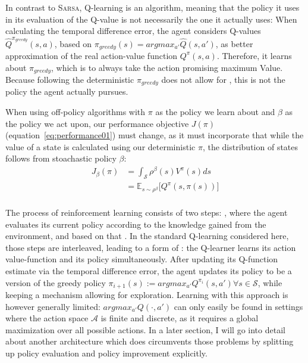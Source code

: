 In contrast to \textsc{Sarsa}, Q-learning is an  algorithm, meaning that the policy it uses in its evaluation of the Q-value is not necessarily the one it actually uses: When calculating the temporal difference error, the agent considers Q-values $\hat{Q}^{\pi_{greedy}}(s,a)$, based on $\pi_{greedy}(s) = argmax_{a'}\hat{Q}(s,a')$, as better approximation of the real action-value function $Q^\pi(s,a)$. Therefore, it learns about $\pi_{greedy}$, which is to always take the action promising maximum Value. Because following the deterministic $\pi_{greedy}$ does not allow for  , this is not the policy the agent actually pursues. 

When using off-policy algorithms with $\pi$ as the policy we learn about and $\beta$ as the policy we act upon, our performance objective $J(\pi)$ (equation~\ref{eq:performance01}) must change, as it must incorporate that while the value of a state is calculated using our deterministic $\pi$, the distribution of states follows from stoachastic policy $\beta$: 
\begin{align} 
	J_\beta(\pi) &= \int_{\mathcal{S}} \rho^\beta(s) V^\pi(s) ds \nonumber\\
	&= \mathds{E}_{s\sim\rho^\beta} \big[Q^\pi(s, \pi(s)) \big] \label{eq:performance}
\end{align}\\

The process of reinforcement learning consists of two steps: , where the agent evaluates its current policy according to the knowledge gained from the environment, and based on that . In the standard Q-learning considered here, those steps are interleaved, leading to a form of : the Q-learner learns its action value-function and its policy simultaneously. After updating its Q-function estimate via the temporal difference error, the agent updates its policy to be a  version of the greedy policy $\pi_{i+1}(s) := argmax_{a'} Q^{\pi_i}(s,a') \forall s \in \mathcal{S}$, while keeping a mechanism allowing for exploration.  Learning with this approach is however generally limited: $argmax_{a'}Q(\cdot, a')$ can only easily be found in settings where the action space $\mathcal{A}$ is finite and discrete, as it requires a global maximization over all possible actions. In a later section, I will go into detail about another architecture which does circumvents those problems by splitting up policy evaluation and policy improvement explicitly.\\


